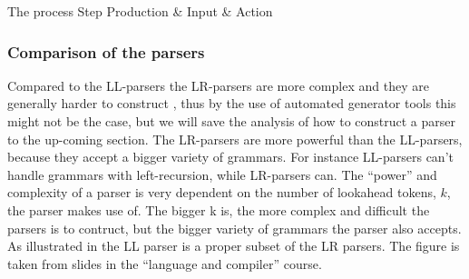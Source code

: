 	  {The process	    					 }
{Step  	 }{Production & Input       & Action                     }{
}

\subsubsection{Comparison of the parsers}
Compared to the LL-parsers the LR-parsers are more complex and they are
generally harder to construct \cite[pp. 193]{sebesta2013}, thus by the use of
automated generator tools this might not be the case, but we will save the
analysis of how to construct a parser to the up-coming section.  The LR-parsers
are more powerful than the LL-parsers, because they accept a bigger variety of
grammars.  For instance LL-parsers can't handle grammars with left-recursion,
while LR-parsers can. The ``power'' and complexity of a parser is very dependent
on the number of lookahead tokens, $k$, the parser makes use of. The bigger k
is, the more complex and difficult the parsers is to contruct, but the bigger
variety of grammars the parser also accepts. As illustrated in
 the LL parser is a proper subset of the LR
parsers.  The figure is taken from slides in the ``language and compiler''
course. 

